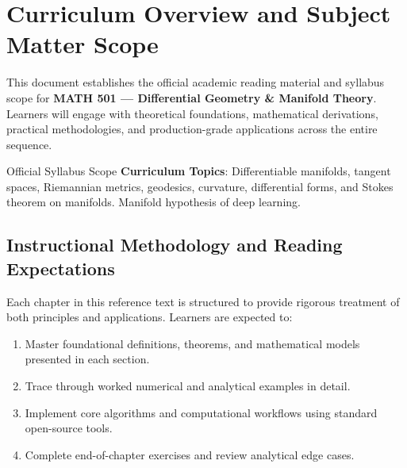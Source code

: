\section{Curriculum Overview and Subject Matter Scope}

This document establishes the official academic reading material and syllabus scope for \textbf{MATH 501 --- Differential Geometry \& Manifold Theory}. Learners will engage with theoretical foundations, mathematical derivations, practical methodologies, and production-grade applications across the entire sequence.

\begin{InsightBox}{Official Syllabus Scope}
  \textbf{Curriculum Topics}: Differentiable manifolds, tangent spaces, Riemannian metrics, geodesics, curvature, differential forms, and Stokes theorem on manifolds. Manifold hypothesis of deep learning.
\end{InsightBox}

\subsection{Instructional Methodology and Reading Expectations}

Each chapter in this reference text is structured to provide rigorous treatment of both principles and applications. Learners are expected to:
\begin{enumerate}
  \item Master foundational definitions, theorems, and mathematical models presented in each section.
  \item Trace through worked numerical and analytical examples in detail.
  \item Implement core algorithms and computational workflows using standard open-source tools.
  \item Complete end-of-chapter exercises and review analytical edge cases.
\end{enumerate}

